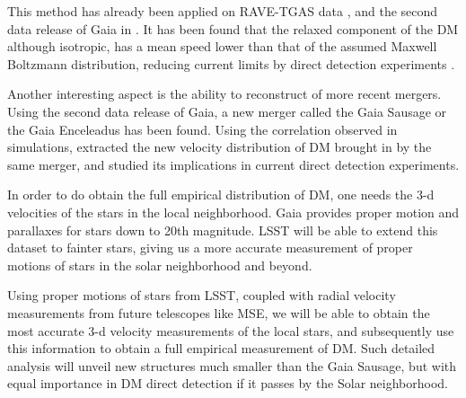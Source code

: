 This method has already been applied on RAVE-TGAS data \citep{Herzog-Arbeitman:2017zbm}, and the second data release of Gaia in \cite{necib2018}. It has been found that the relaxed component of the DM although isotropic, has a mean speed lower than that of the assumed Maxwell Boltzmann distribution, reducing current limits by direct detection experiments \citep{Aprile:2018dbl}.

Another interesting aspect is the ability to reconstruct of more recent mergers. Using the second data release of Gaia, a new merger called the Gaia Sausage or the Gaia Enceleadus \citep{2018MNRAS.477.1472B,2018Natur.563...85H} has been found. Using the correlation observed in simulations, \cite{necib2018} extracted the new velocity distribution of DM brought in by the same merger, and studied its implications in current direct detection experiments. 

In order to do obtain the full empirical distribution of DM, one needs the 3-d velocities of the stars in the local neighborhood. Gaia provides proper motion and parallaxes for stars down to 20th magnitude. LSST will be able to extend this dataset to fainter stars, giving us a more accurate measurement of proper motions of stars in the solar neighborhood and beyond.

 Using proper motions of stars from LSST, coupled with radial velocity measurements from future telescopes like MSE, we will be able to obtain the most accurate 3-d velocity measurements of the local stars, and subsequently use this information to obtain a full empirical measurement of DM. Such detailed analysis will unveil new structures much smaller than the Gaia Sausage, but with equal importance in DM direct detection if it passes by the Solar neighborhood.
